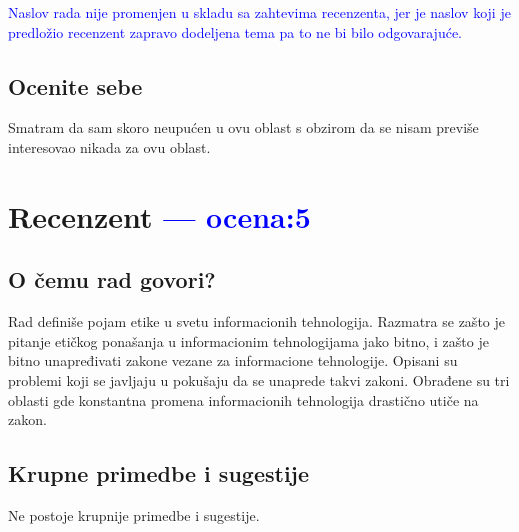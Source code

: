 \documentclass[a4paper]{report}
\newcommand{\odgovor}[1]{\textcolor{blue}{#1}}
\begin{document}
\odgovor{Naslov rada nije promenjen u skladu sa zahtevima recenzenta, jer je naslov koji je predložio recenzent zapravo dodeljena tema pa to ne bi bilo odgovarajuće.}

\section{Ocenite sebe}
Smatram da sam skoro neupućen u ovu oblast s obzirom da se nisam previše interesovao nikada za ovu oblast.

\chapter{Recenzent \odgovor{--- ocena:5} }


\section{O čemu rad govori?}
Rad definiše pojam etike u svetu informacionih tehnologija. Razmatra se zašto je pitanje etičkog ponašanja u informacionim tehnologijama jako bitno, i zašto je bitno unapređivati zakone vezane za informacione tehnologije. Opisani su problemi koji se javljaju u pokušaju da se unaprede takvi zakoni. Obrađene su tri oblasti gde konstantna promena informacionih tehnologija drastično utiče na zakon.

\section{Krupne primedbe i sugestije}
Ne postoje krupnije primedbe i sugestije.
\end{document}
